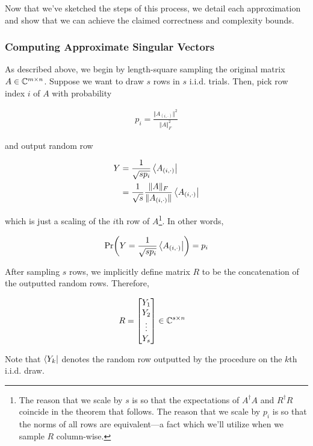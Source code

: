 \documentclass[main.tex]{subfiles}
\begin{document}
{Now that we've sketched the steps of this process, we detail each approximation and show that we can achieve the claimed correctness and complexity bounds.

\subsubsection{Computing Approximate Singular Vectors}

As described above, we begin by length-square sampling the original matrix $A \in \mathbb{C}^{m \times n }$. Suppose we want to draw $s$ rows in $s$ i.i.d. trials. Then, pick row index $i$ of $A$ with probability

\begin{align}
\label{def:A-prob}
p_i = \frac{\Vert A_{(i, \cdot)}\Vert^2}{\Vert A \Vert_F^2} 	
\end{align}

and output random row 

\begin{align*}
 	Y &= \frac{1}{\sqrt{s p_i}} \bra{A_{(i, \cdot)}} \\\
 	&= \frac{1}{\sqrt{s}}\frac{\Vert A\Vert_F}{\Vert A_{(i, \cdot)}\Vert}\bra{A_{(i, \cdot)}}
\end{align*}

which is just a scaling of the $i$th row of $A$\footnote{The reason that we scale by $s$ is so that the expectations of $A^\dag A$ and $R^\dag R$ coincide in the theorem that follows. The reason that we scale by $p_i$ is so that the norms of all rows are equivalent---a fact which we'll utilize when we sample $R$ column-wise.}. In other words,

\begin{align*}
\Pr(Y = \frac{1}{\sqrt{s p_i}} \bra{A_{(i, \cdot)}}) = p_i
\end{align*}


After sampling $s$ rows, we implicitly define matrix $R$ to be the concatenation of the outputted random rows. Therefore,

\begin{align}
\label{def:R}
R &= \begin{bmatrix}
Y_1 \\
Y_2 \\
\vdots \\
Y_s
\end{bmatrix} \in \mathbb{C}^{s \times n}
\end{align}

Note that $\bra{Y_k}$ denotes the random row outputted by the procedure on the $k$th i.i.d. draw.

}
\end{document}

